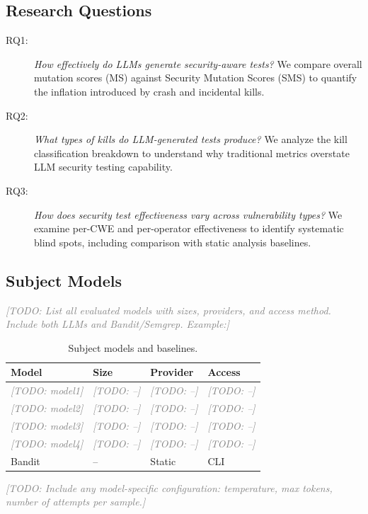 \documentclass[sigconf,review,anonymous]{acmart}
\newcommand{\todo}[1]{\textcolor{gray}{\textit{[TODO: #1]}}}
\begin{document}
\subsection{Research Questions}

\begin{description}
    \item[RQ1:] \textit{How effectively do LLMs generate security-aware tests?} We compare overall mutation scores (MS) against Security Mutation Scores (SMS) to quantify the inflation introduced by crash and incidental kills.
    
    \item[RQ2:] \textit{What types of kills do LLM-generated tests produce?} We analyze the kill classification breakdown to understand why traditional metrics overstate LLM security testing capability.
    
    \item[RQ3:] \textit{How does security test effectiveness vary across vulnerability types?} We examine per-CWE and per-operator effectiveness to identify systematic blind spots, including comparison with static analysis baselines.
\end{description}


\subsection{Subject Models}

\todo{List all evaluated models with sizes, providers, and access method. Include both LLMs and Bandit/Semgrep. Example:}

\begin{table}[t]
\caption{Subject models and baselines.}
\label{tab:models}
\small
\begin{tabular}{llll}
\toprule
\textbf{Model} & \textbf{Size} & \textbf{Provider} & \textbf{Access} \\
\midrule
\todo{model1} & \todo{--} & \todo{--} & \todo{--} \\
\todo{model2} & \todo{--} & \todo{--} & \todo{--} \\
\todo{model3} & \todo{--} & \todo{--} & \todo{--} \\
\todo{model4} & \todo{--} & \todo{--} & \todo{--} \\
\midrule
Bandit & -- & Static & CLI \\
\bottomrule
\end{tabular}
\end{table}

\todo{Include any model-specific configuration: temperature, max tokens, number of attempts per sample.}
\end{document}
